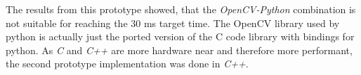 The results from this prototype showed, that the \textit{OpenCV-Python} combination is not suitable for reaching the 30 ms target time. The OpenCV library used by python is actually just the ported version of the C code library with bindings for python. As \textit{C} and \textit{C++} are more hardware near and therefore more performant, the second prototype implementation was done in \textit{C++}.
